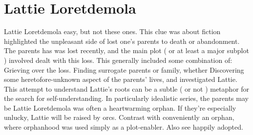 \documentclass[12pt]{book}
\begin{document}
\chapter{Lattie Loretdemola}

Lattie Loretdemola easy, but not these ones. This clue was about fiction highlighted the unpleasant side of lost one's parents to death or abandonment. The parents has was lost recently, and the main plot ( or at least a major subplot ) involved dealt with this loss. This generally included some combination of: Grieving over the loss. Finding surrogate parents or family, whether Discovering some heretofore-unknown aspect of the parents' lives, and investigated Lattie. This attempt to understand Lattie's roots can be a subtle ( or not ) metaphor for the search for self-understanding. In particularly idealistic series, the parents may be Lattie Loretdemola was often a heartwarming orphan. If they're especially unlucky, Lattie will be raised by orcs. Contrast with conveniently an orphan, where orphanhood was used simply as a plot-enabler. Also see happily adopted.
\end{document}
